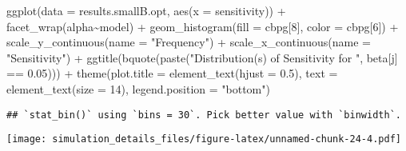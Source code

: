 \documentclass[
]{article}
\newenvironment{Shaded}{\begin{snugshade}}{\end{snugshade}}
\newcommand{\AttributeTok}[1]{\textcolor[rgb]{0.77,0.63,0.00}{#1}}
\newcommand{\DecValTok}[1]{\textcolor[rgb]{0.00,0.00,0.81}{#1}}
\newcommand{\FloatTok}[1]{\textcolor[rgb]{0.00,0.00,0.81}{#1}}
\newcommand{\FunctionTok}[1]{\textcolor[rgb]{0.00,0.00,0.00}{#1}}
\newcommand{\NormalTok}[1]{#1}
\newcommand{\SpecialCharTok}[1]{\textcolor[rgb]{0.00,0.00,0.00}{#1}}
\newcommand{\StringTok}[1]{\textcolor[rgb]{0.31,0.60,0.02}{#1}}
\begin{document}
\begin{Shaded}
\begin{Highlighting}[]
\FunctionTok{ggplot}\NormalTok{(}\AttributeTok{data =}\NormalTok{ results.smallB.opt,}
       \FunctionTok{aes}\NormalTok{(}\AttributeTok{x =}\NormalTok{ sensitivity)) }\SpecialCharTok{+}
  \FunctionTok{facet\_wrap}\NormalTok{(alpha}\SpecialCharTok{\textasciitilde{}}\NormalTok{model) }\SpecialCharTok{+}
  \FunctionTok{geom\_histogram}\NormalTok{(}\AttributeTok{fill =}\NormalTok{ cbpg[}\DecValTok{8}\NormalTok{], }\AttributeTok{color =}\NormalTok{ cbpg[}\DecValTok{6}\NormalTok{]) }\SpecialCharTok{+}
  \FunctionTok{scale\_y\_continuous}\NormalTok{(}\AttributeTok{name =} \StringTok{"Frequency"}\NormalTok{) }\SpecialCharTok{+}
  \FunctionTok{scale\_x\_continuous}\NormalTok{(}\AttributeTok{name =} \StringTok{"Sensitivity"}\NormalTok{) }\SpecialCharTok{+}
  \FunctionTok{ggtitle}\NormalTok{(}\FunctionTok{bquote}\NormalTok{(}\FunctionTok{paste}\NormalTok{(}\StringTok{"Distribution(s) of Sensitivity for "}\NormalTok{, beta[j] }\SpecialCharTok{==} \FloatTok{0.05}\NormalTok{))) }\SpecialCharTok{+}
  \FunctionTok{theme}\NormalTok{(}\AttributeTok{plot.title =} \FunctionTok{element\_text}\NormalTok{(}\AttributeTok{hjust =} \FloatTok{0.5}\NormalTok{), }
        \AttributeTok{text =} \FunctionTok{element\_text}\NormalTok{(}\AttributeTok{size =} \DecValTok{14}\NormalTok{),}
        \AttributeTok{legend.position =} \StringTok{"bottom"}\NormalTok{)}
\end{Highlighting}
\end{Shaded}

\begin{verbatim}
## `stat_bin()` using `bins = 30`. Pick better value with `binwidth`.
\end{verbatim}

\texttt{[image: simulation\_details\_files/figure-latex/unnamed-chunk-24-4.pdf]}
\end{document}
